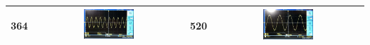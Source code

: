 \documentclass[12pt]{article}%
\numberwithin{equation}{section}
\begin{document}
\begin{enumerate}
\begin{table}[htbp]
\begin{tabular}{|c|c|c|c|}
364            &  \includegraphics[width=0.35\textwidth]{gaopin3/gaopin316.jpg}  & 520            &    \includegraphics[width=0.35\textwidth]{gaopin3/gaopin314.jpg} \\\hline
\end{tabular}
\end{table}


\end{enumerate}
\end{document}
